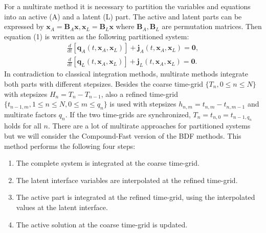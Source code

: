 \documentclass{report}
\begin{document}
For a multirate method it
is necessary to partition the variables and equations into
an active (A) and a latent (L) part. The active and latent
parts can be expressed by $\mathbf{x}_A = \mathbf{B}_A
\mathbf{x},\mathbf{x}_L = \mathbf{B}_L \mathbf{x}$ where
$\mathbf{B}_A,\mathbf{B}_L$ are permutation matrices. Then
equation (1) is written as the following
partitioned system:
$$
\begin{array}{c} \frac{d}{dt}\left
[\mathbf{q}_{A}(t,\mathbf{x}_A,\mathbf{x}_L)\right
]+\mathbf{j}_{A}(t,\mathbf{x}_A,\mathbf{x}_L)=\mathbf{0},\\
\frac{d}{dt}\left
[\mathbf{q}_{L}(t,\mathbf{x}_A,\mathbf{x}_L)\right
]+\mathbf{j}_{L}(t,\mathbf{x}_A,\mathbf{x}_L)=\mathbf{0}.
\end{array}
$$
In contradiction to classical
integration methods, multirate methods integrate both parts
with different stepsizes. Besides the coarse time-grid
$\{T_n,0\leq n \leq N\}$ with stepsizes $H_n = T_n -
T_{n-1}$, also a refined time-grid $\{t_{n-1,m},1\leq n \leq
N, 0 \leq m \leq q_n\}$ is used with stepsizes $h_{n,m} =
t_{n,m} - t_{n,m-1}$ and multirate factors $q_n$. If the two
time-grids are synchronized, $T_n= t_{n,0} = t_{n-1,q_n}$
holds for all $n$. There are a lot of multirate approaches
for partitioned systems but we will consider the
Compound-Fast version of the BDF methods. This method
performs the following four steps:
\begin{enumerate}
\item
The complete system is integrated at the coarse time-grid.
\item The latent interface variables are interpolated at the
refined time-grid. \item The active part is integrated at
the refined time-grid, using the interpolated values at the
latent interface. \item The active solution at the coarse
time-grid is updated.
\end{enumerate}
\end{document}
